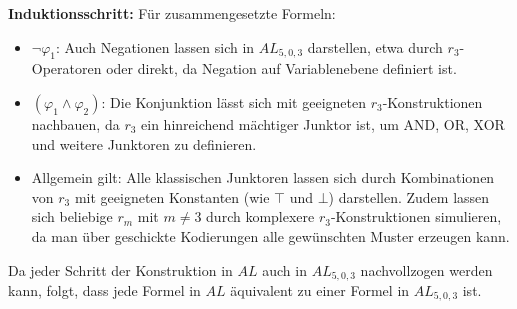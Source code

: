 \documentclass[12pt,a4paper]{article}
\begin{document}
\textbf{Induktionsschritt:}  
Für zusammengesetzte Formeln:
\begin{itemize}
    \item $\neg \varphi_1$: Auch Negationen lassen sich in $AL_{5,0,3}$ darstellen, etwa durch $r_3$-Operatoren oder direkt, da Negation auf Variablenebene definiert ist.
    \item $(\varphi_1 \land \varphi_2)$: Die Konjunktion lässt sich mit geeigneten $r_3$-Konstruktionen nachbauen, da $r_3$ ein hinreichend mächtiger Junktor ist, um AND, OR, XOR und weitere Junktoren zu definieren.
    \item Allgemein gilt: Alle klassischen Junktoren lassen sich durch Kombinationen von $r_3$ mit geeigneten Konstanten (wie $\top$ und $\bot$) darstellen. Zudem lassen sich beliebige $r_m$ mit $m \neq 3$ durch komplexere $r_3$-Konstruktionen simulieren, da man über geschickte Kodierungen alle gewünschten Muster erzeugen kann.
\end{itemize}

Da jeder Schritt der Konstruktion in $AL$ auch in $AL_{5,0,3}$ nachvollzogen werden kann, folgt, dass jede Formel in $AL$ äquivalent zu einer Formel in $AL_{5,0,3}$ ist.
\end{document}
